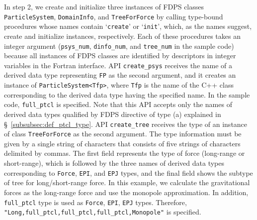 \documentclass[proof,useamsfonts]{pasj01}
\begin{document}
In step 2, we create and initialize three instances of FDPS classes \texttt{ParticleSystem}, \texttt{DomainInfo}, and \texttt{TreeForForce} by calling type-bound procedures whose names contain `\texttt{create}' or `\texttt{init}', which, as the names suggest, create and initialize instances, respectively. Each of these procedures takes an integer argument (\texttt{psys\_num}, \texttt{dinfo\_num}, and \texttt{tree\_num} in the sample code) because all instances of FDPS classes are identified by descriptors in integer variables in the Fortran interface. API \texttt{create\_psys} receives the name of a derived data type representing \texttt{FP} as the second argument, and it creates an instance of \texttt{ParticleSystem<Tfp>}, where \texttt{Tfp} is the name of the C++ class corresponding to the derived data type having the specified name. In the sample code, \texttt{full\_ptcl} is specified. Note that this API accepts only the names of derived data types qualified by FDPS directive of type (a) explained in \S~\ref{subsubsec:def_ptcl_type}. API \texttt{create\_tree} receives the type of an instance of class \texttt{TreeForForce} as the second argument. The type information must be given by a single string of characters that consists of five strings of characters delimited by commas. The first field represents the type of force (long-range or short-range), which is followed by the three names of derived data types corresponding to \texttt{Force}, \texttt{EPI}, and \texttt{EPJ} types, and the final field shows the subtype of tree for long/short-range force. In this example, we calculate the gravitational forces as the long-range force and use the monopole approximation. In addition, \texttt{full\_ptcl} type is used as \texttt{Force}, \texttt{EPI}, \texttt{EPJ} types. Therefore, \texttt{"Long,full\_ptcl,full\_ptcl,full\_ptcl,Monopole"} is specified.
\end{document}
